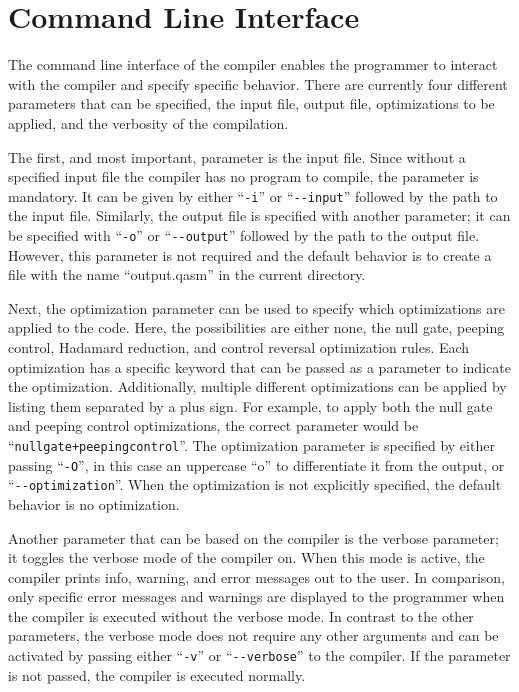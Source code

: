 \section{Command Line Interface}
The command line interface of the compiler enables the programmer to interact with the compiler and specify specific behavior. There are currently four different parameters that can be specified, the input file, output file, optimizations to be applied, and the verbosity of the compilation. 

The first, and most important, parameter is the input file. Since without a specified input file the compiler has no program to compile, the parameter is mandatory. It can be given by either ``\texttt{-i}'' or ``\texttt{-{}-input}'' followed by the path to the input file. Similarly, the output file is specified with another parameter; it can be specified with ``\texttt{-o}'' or ``\texttt{-{}-output}'' followed by the path to the output file.  However, this parameter is not required and the default behavior is to create a file with the name ``output.qasm'' in the current directory.

Next, the optimization parameter can be used to specify which optimizations are applied to the code. Here, the possibilities are either none, the null gate, peeping control, Hadamard reduction, and control reversal optimization rules. Each optimization has a specific keyword that can be passed as a parameter to indicate the optimization. Additionally, multiple different optimizations can be applied by listing them separated by a plus sign.
For example, to apply both the null gate and peeping control optimizations, the correct parameter would be ``\texttt{nullgate+peepingcontrol}''. The optimization parameter is specified by either passing ``\texttt{-O}'', in this case an uppercase ``o'' to differentiate it from the output, or ``\texttt{-{}-optimization}''. When the optimization is not explicitly specified, the default behavior is no optimization. 

Another parameter that can be based on the compiler is the verbose parameter; it toggles the verbose mode of the compiler on. When this mode is active, the compiler prints info, warning, and error messages out to the user. In comparison, only specific error messages and warnings are displayed to the programmer when the compiler is executed without the verbose mode. In contrast to the other parameters, the verbose mode does not require any other arguments and can be activated by passing either ``\texttt{-v}'' or ``\texttt{-{}-verbose}'' to the compiler. If the parameter is not passed, the compiler is executed normally. 

